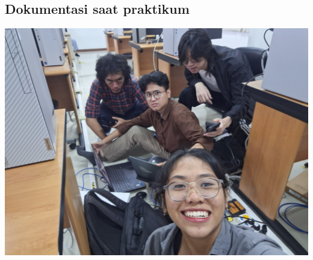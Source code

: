 \subsection{Dokumentasi saat praktikum}
\begin{center}
        \includegraphics[scale=0.1]{P1/img/dokum.jpg}
    \end{center}